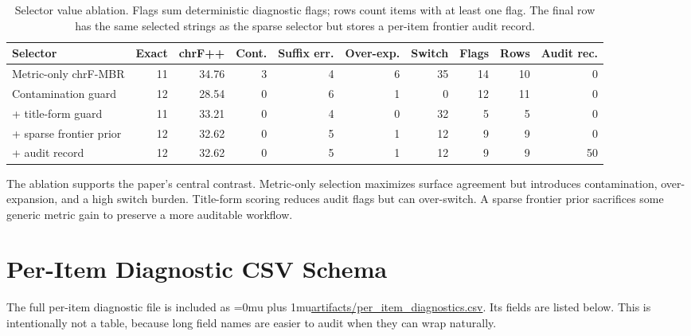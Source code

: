 \documentclass{article}
\newcommand{\pathcode}[1]{{\begingroup\Urlmuskip=0mu plus 1mu\url{#1}\endgroup}}
\begin{document}
\begin{table}[H]
\centering
\small
\begin{tabularx}{\textwidth}{@{}Xrrrrrrrrr@{}}
\toprule
Selector & Exact & chrF++ & Cont. & Suffix err. & Over-exp. & Switch & Flags & Rows & Audit rec. \\
\midrule
Metric-only chrF-MBR & 11 & 34.76 & 3 & 4 & 6 & 35 & 14 & 10 & 0 \\
Contamination guard & 12 & 28.54 & 0 & 6 & 1 & 0 & 12 & 11 & 0 \\
+ title-form guard & 11 & 33.21 & 0 & 4 & 0 & 32 & 5 & 5 & 0 \\
+ sparse frontier prior & 12 & 32.62 & 0 & 5 & 1 & 12 & 9 & 9 & 0 \\
+ audit record & 12 & 32.62 & 0 & 5 & 1 & 12 & 9 & 9 & 50 \\
\bottomrule
\end{tabularx}
\caption{Selector value ablation. Flags sum deterministic diagnostic flags; rows count items with at least one flag. The final row has the same selected strings as the sparse selector but stores a per-item frontier audit record.}
\end{table}

The ablation supports the paper's central contrast. Metric-only selection maximizes surface agreement but introduces contamination, over-expansion, and a high switch burden. Title-form scoring reduces audit flags but can over-switch. A sparse frontier prior sacrifices some generic metric gain to preserve a more auditable workflow.

\section{Per-Item Diagnostic CSV Schema}

The full per-item diagnostic file is included as \pathcode{artifacts/per_item_diagnostics.csv}. Its fields are listed below. This is intentionally not a table, because long field names are easier to audit when they can wrap naturally.
\end{document}
